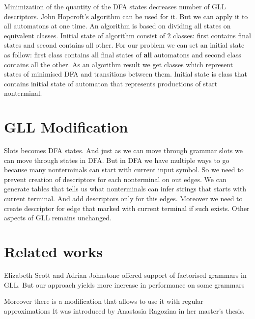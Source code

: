 \documentclass[runningheads,a4paper]{llncs}
\begin{document}
Minimization of the quantity of the DFA states decreases number of GLL descriptors. John Hopcroft's 
algorithm\cite{hopcroft1971n} can be used for it. But we can apply it to all automatons at one time. 
An algorithm is based on dividing all states on equivalent classes. Initial state of algorithm consist 
of 2 classes: first contains final states and second contains all other. For our problem we can set an 
initial state as follow: first class contains all final states of \textbf{all} automatons and second class 
contains all the other. As an algorithm result we get classes which represent states of minimised DFA and 
transitions between them.
Initial state is class that contains initial state of automaton that represents productions of start nonterminal. 


\section{GLL Modification}
Slots becomes DFA states. And just as we can move through grammar slots we can move through states 
in DFA. But in DFA we have multiple ways to go because many nonterminals can start with current input symbol. 
So we need to prevent creation of descriptors for each nonterminal on out edges. We can generate tables that 
tells us what nonterminals can infer strings that starts with current terminal. And add descriptors only for 
this edges. Moreover we need to create descriptor for edge that marked with current terminal if such exists.
Other aspects of GLL remains unchanged.



\section{Related works}%

Elizabeth Scott and Adrian Johnstone offered support of factorised grammars in GLL\cite{scott2016structuring}. 
But our approach yields more increase in performance on some grammars

Moreover there is a modification that allows to use it with regular approximations It was introduced by 
Anastasia Ragozina in her master's thesis.





\end{document}

